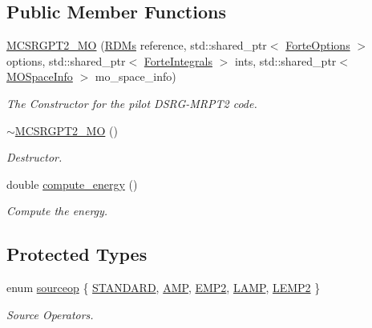 \subsection*{Public Member Functions}
\begin{DoxyCompactItemize}
\item 
\mbox{\hyperlink{classforte_1_1_m_c_s_r_g_p_t2___m_o_a52774da32a658fa6b46a7b176a8df564}{M\+C\+S\+R\+G\+P\+T2\+\_\+\+MO}} (\mbox{\hyperlink{classforte_1_1_r_d_ms}{R\+D\+Ms}} reference, std\+::shared\+\_\+ptr$<$ \mbox{\hyperlink{classforte_1_1_forte_options}{Forte\+Options}} $>$ options, std\+::shared\+\_\+ptr$<$ \mbox{\hyperlink{classforte_1_1_forte_integrals}{Forte\+Integrals}} $>$ ints, std\+::shared\+\_\+ptr$<$ \mbox{\hyperlink{classforte_1_1_m_o_space_info}{M\+O\+Space\+Info}} $>$ mo\+\_\+space\+\_\+info)
\begin{DoxyCompactList}\small\item\em The Constructor for the pilot D\+S\+R\+G-\/\+M\+R\+P\+T2 code. \end{DoxyCompactList}\item 
\mbox{\hyperlink{classforte_1_1_m_c_s_r_g_p_t2___m_o_a64d29f95654d1ca214b49674e918b535}{$\sim$\+M\+C\+S\+R\+G\+P\+T2\+\_\+\+MO}} ()
\begin{DoxyCompactList}\small\item\em Destructor. \end{DoxyCompactList}\item 
double \mbox{\hyperlink{classforte_1_1_m_c_s_r_g_p_t2___m_o_a8983a928beadc64ac842e55d70e23d1d}{compute\+\_\+energy}} ()
\begin{DoxyCompactList}\small\item\em Compute the energy. \end{DoxyCompactList}\end{DoxyCompactItemize}
\subsection*{Protected Types}
\begin{DoxyCompactItemize}
\item 
enum \mbox{\hyperlink{classforte_1_1_m_c_s_r_g_p_t2___m_o_a541d16aa14bd6d3e685b6bda0b8602f1}{sourceop}} \{ \newline
\mbox{\hyperlink{classforte_1_1_m_c_s_r_g_p_t2___m_o_a541d16aa14bd6d3e685b6bda0b8602f1a0b64256e8b44dbe842be9d5698318579}{S\+T\+A\+N\+D\+A\+RD}}, 
\mbox{\hyperlink{classforte_1_1_m_c_s_r_g_p_t2___m_o_a541d16aa14bd6d3e685b6bda0b8602f1a5811e417c1c498623bd94d1d5013df95}{A\+MP}}, 
\mbox{\hyperlink{classforte_1_1_m_c_s_r_g_p_t2___m_o_a541d16aa14bd6d3e685b6bda0b8602f1ae712aa6a2ffadd5f220d8f1700eb94af}{E\+M\+P2}}, 
\mbox{\hyperlink{classforte_1_1_m_c_s_r_g_p_t2___m_o_a541d16aa14bd6d3e685b6bda0b8602f1af1f23d90950da0348be1b106dd5c84b3}{L\+A\+MP}}, 
\newline
\mbox{\hyperlink{classforte_1_1_m_c_s_r_g_p_t2___m_o_a541d16aa14bd6d3e685b6bda0b8602f1a1988646a02aba967738d55d47907fd28}{L\+E\+M\+P2}}
 \}
\begin{DoxyCompactList}\small\item\em Source Operators. \end{DoxyCompactList}\end{DoxyCompactItemize}
